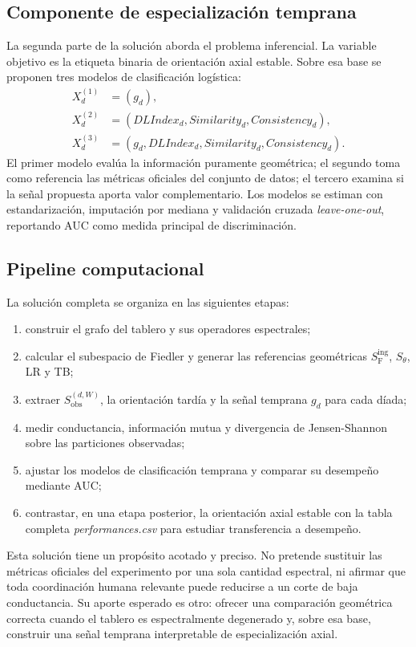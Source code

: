 \documentclass[journal]{IEEEtran}
\newcommand{\Sobs}{S_{\mathrm{obs}}}
\newcommand{\Sing}{S^{\mathrm{ing}}_{\mathrm{F}}}
\begin{document}
\subsection{Componente de especialización temprana}

La segunda parte de la solución aborda el problema inferencial. La variable objetivo es la etiqueta binaria de orientación axial estable. Sobre esa base se proponen tres modelos de clasificación logística:
\begin{align}
X_d^{(1)} &= (g_d),\\
X_d^{(2)} &= (DLIndex_d, Similarity_d, Consistency_d),\\
X_d^{(3)} &= (g_d, DLIndex_d, Similarity_d, Consistency_d).
\end{align}
El primer modelo evalúa la información puramente geométrica; el segundo toma como referencia las métricas oficiales del conjunto de datos; el tercero examina si la señal propuesta aporta valor complementario. Los modelos se estiman con estandarización, imputación por mediana y validación cruzada \emph{leave-one-out}, reportando AUC como medida principal de discriminación.

\subsection{Pipeline computacional}

La solución completa se organiza en las siguientes etapas:
\begin{enumerate}
\item construir el grafo del tablero y sus operadores espectrales;
\item calcular el subespacio de Fiedler y generar las referencias geométricas $\Sing$, $S_\theta$, LR y TB;
\item extraer $\Sobs^{(d,W)}$, la orientación tardía y la señal temprana $g_d$ para cada díada;
\item medir conductancia, información mutua y divergencia de Jensen-Shannon sobre las particiones observadas;
\item ajustar los modelos de clasificación temprana y comparar su desempeño mediante AUC;
\item contrastar, en una etapa posterior, la orientación axial estable con la tabla completa \emph{performances.csv} para estudiar transferencia a desempeño.
\end{enumerate}

Esta solución tiene un propósito acotado y preciso. No pretende sustituir las métricas oficiales del experimento por una sola cantidad espectral, ni afirmar que toda coordinación humana relevante puede reducirse a un corte de baja conductancia. Su aporte esperado es otro: ofrecer una comparación geométrica correcta cuando el tablero es espectralmente degenerado y, sobre esa base, construir una señal temprana interpretable de especialización axial.
\end{document}
